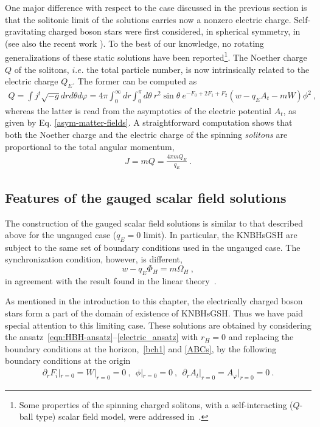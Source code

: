 One major difference with respect to the case 
discussed in the previous section 
 is that the solitonic limit of the solutions carries now a nonzero electric charge.
Self-gravitating charged boson stars were first considered, in spherical symmetry, in~\cite{Jetzer:1989av} 
(see also the recent work  \cite{Pugliese:2013gsa}). 
To the best of our knowledge, no rotating generalizations of these static solutions have been reported\footnote{ 
Some properties of the spinning charged solitons, 
with a self-interacting ($Q$-ball type) scalar field model, were addressed in~\cite{Brihaye:2009dx}.
}.
The Noether charge $Q$ of the solitons, $i.e.$ the total
particle number, is now intrinsically related to the electric charge $Q_E$. 
The former can be computed as  
%
\begin{eqnarray}
\label{Q1}
Q= \int j^t \sqrt{-g} dr  d\theta d\varphi=
 4\pi \int_{0}^\infty dr \int_0^\pi d\theta  
~r^2\sin \theta ~e^{-F_0+2F_1+F_2}  (w-q_E A_t -mW)\phi^2 \ ,
\end{eqnarray}
%
whereas the latter is read from the asymptotics
 of the electric potential $A_t$, as given by Eq. \eqref{asym-matter-fields}.
A straightforward computation 
shows that both the Noether charge and the electric charge of the spinning \textit{solitons}
are proportional  to the total angular momentum,
\begin{eqnarray}
\label{JQ}
J= m Q=\frac{4 \pi m Q_E}{q_E}\ .
\end{eqnarray} 


\subsection{Features of the gauged scalar field solutions}
\label{sec_results_g}
 
The construction of the  gauged scalar field solutions is similar 
to that described above for the ungauged case ($q_E=0$ limit).
In particular, the KNBHsGSH are subject to the same set of 
boundary conditions  used in the ungauged case.
The synchronization condition, however, is different,   
\begin{equation}
\label{cond-new}
 w-q_E \Phi_H=m \Omega_H \ ,
\end{equation}
in agreement with the result found in the linear theory~\cite{Hod:2014baa,Benone:2014ssa}.

As mentioned in the introduction to this chapter, the electrically charged boson stars form a part of the domain of existence of KNBHsGSH. 
Thus we have paid special attention to this limiting case.
These solutions  are obtained by considering the ansatz~\eqref{eqn:HBH-ansatz}--\eqref{electric_ansatz} with $r_H=0$ 
and replacing the boundary conditions at the horizon,~\eqref{bch1} and \eqref{ABCs},
by the following boundary conditions at the origin
\begin{eqnarray}
\label{bc0} 
\partial_r F_i|_{r=0}= 
W|_{r=0}=0\ ,~~
\phi| _{r =0}=0\ ,~~\partial_r A_t|_{r=0}=A_\varphi|_{r=0}=0\ .
\end{eqnarray}
% 

